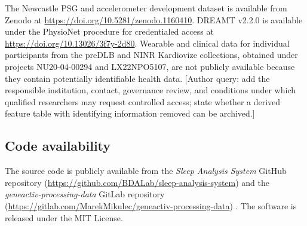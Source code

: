 \documentclass[referee,pdflatex,sn-vancouver-num]{sn-jnl}
\begin{document}
The Newcastle PSG and accelerometer development dataset is available from Zenodo
at \url{https://doi.org/10.5281/zenodo.1160410}. DREAMT v2.2.0 is available
under the PhysioNet procedure for credentialed access at
\url{https://doi.org/10.13026/3f7y-2d80}. Wearable and clinical data for individual
participants from the preDLB and NINR Kardiovize collections, obtained under
projects NU20-04-00294 and LX22NPO5107, are not publicly available
because they contain potentially identifiable health data. [Author query: add
the responsible institution, contact, governance review, and conditions under
which qualified researchers may request controlled access; state whether a
derived feature table with identifying information removed can be archived.]

\subsection*{Code availability}

The source code is publicly available from the \textit{Sleep Analysis System}
GitHub repository (\url{https://github.com/BDALab/sleep-analysis-system}) and
the \textit{geneactiv-processing-data} GitLab repository
(\url{https://gitlab.com/MarekMikulec/geneactiv-processing-data})
\cite{bdalab2026sleepanalysis,mikulec2026geneactiv}. The software is released
under the MIT License.




\begingroup
{}

\endgroup
\end{document}
